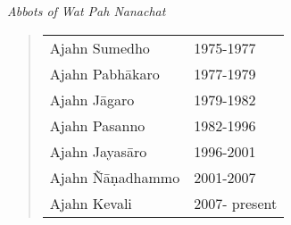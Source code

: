 
\clearpage
\thispagestyle{empty}
\vspace*{4\baselineskip}

\emph{Abbots of Wat Pah Nanachat}

\begin{quote}
\begin{tabular}{l l}
Ajahn Sumedho & 1975-1977\\
Ajahn Pabhākaro & 1977-1979\\
Ajahn Jāgaro & 1979-1982\\
Ajahn Pasanno & 1982-1996\\
Ajahn Jayasāro & 1996-2001\\
Ajahn Ñāṇadhammo & 2001-2007\\
Ajahn Kevali & 2007- present\\
\end{tabular}
\end{quote}

